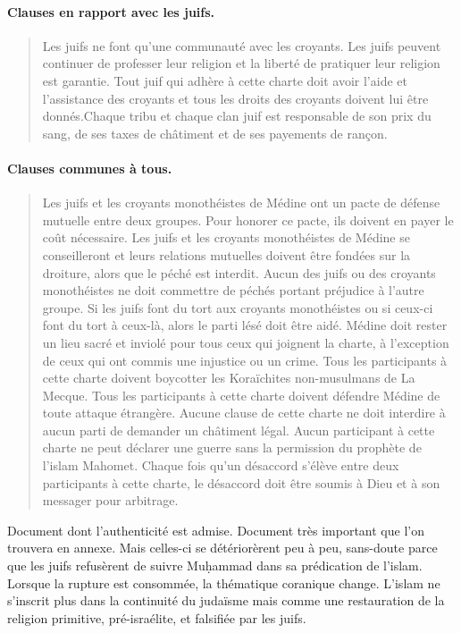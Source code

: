 \paragraph{{Clauses en rapport avec les
juifs.}} 
 \begin{quote}
Les juifs ne font qu'une communauté avec les
croyants. Les juifs peuvent continuer de professer leur religion et
la liberté de pratiquer leur religion est
garantie.   Tout juif qui adhère à cette charte doit avoir l'aide et
l'assistance des croyants et tous les droits des croyants doivent lui
être
donnés.Chaque tribu et chaque clan juif est responsable de son
prix du sang, de ses taxes de châtiment et de ses payements de
rançon.
  \end{quote} 
\paragraph{Clauses communes à
tous.} 
 \begin{quote}
Les juifs et les croyants monothéistes de Médine ont un
pacte de défense mutuelle entre deux groupes. Pour honorer ce pacte, ils
doivent en payer le coût
nécessaire. Les juifs et les croyants monothéistes de Médine se
conseilleront et leurs relations mutuelles doivent être fondées sur la
droiture, alors que le péché est
interdit. Aucun des juifs ou des croyants monothéistes ne doit
commettre de péchés portant préjudice à l'autre
groupe. Si les juifs font du tort aux croyants monothéistes ou si
ceux-ci font du tort à ceux-là, alors le parti lésé doit être
aidé. Médine doit rester un lieu sacré et inviolé pour tous
ceux qui joignent la charte, à l'exception de ceux qui ont commis une
injustice ou un
crime. Tous les participants à cette charte doivent boycotter
les Koraïchites non-musulmans de La
Mecque. Tous les participants à cette charte doivent défendre
Médine de toute attaque
étrangère. Aucune clause de cette charte ne doit interdire à aucun
parti de demander un châtiment
légal. Aucun participant à cette charte ne peut déclarer une
guerre sans la permission du prophète de l'islam
Mahomet. Chaque fois qu'un désaccord s'élève entre deux
participants à cette charte, le désaccord doit être soumis à Dieu et à
son messager pour
arbitrage.

 

    
\end{quote}
Document dont l'authenticité est admise. Document très important que
l'on trouvera en annexe. Mais celles-ci se détériorèrent peu à peu,
sans-doute parce que les juifs refusèrent de suivre Muḥammad dans sa
prédication de l'islam. Lorsque la rupture est consommée, la thématique
coranique change. L'islam ne s'inscrit plus dans la continuité du
judaïsme mais comme une restauration de la religion primitive,
pré-israélite, et falsifiée par les juifs.


